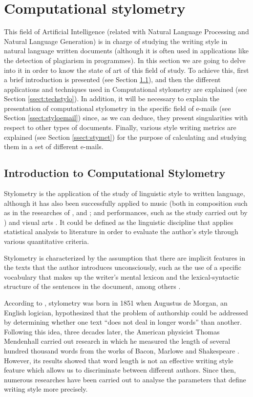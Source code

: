 \section{Computational stylometry}\label{sect:compstyl}
This field of Artificial Intelligence (related with Natural Language Processing and Natural Language Generation) is in charge of studying the writing style in natural language written documents (although it is often used in applications like the detection of plagiarism in programmes). In this section we are going to delve into it in order to know the state of art of this field of study. To achieve this, first a brief introduction is presented (see Section \ref{ssect:introstylo}), and then the different applications and techniques used in Computational stylometry are explained (see Section \ref{ssect:techstylo}). In addition, it will be necessary to explain the presentation of computational stylometry in the specific field of e-mails (see Section \ref{ssect:styloemail}) since, as we can deduce, they present singularities with respect to other types of documents. Finally, various style writing metrics are explained (see Section \ref{ssect:stymet}) for the purpose of calculating and studying them in a set of different e-mails.

\subsection{Introduction to Computational Stylometry}\label{ssect:introstylo}
Stylometry \citep{hughes2012quantitative} is the application of the study of linguistic style to written language, although it has also been successfully applied to music (both in composition such as in the researches of \cite{manaris2005zipf}, \cite{casey2008analysis} and \cite{huron1991ramp}; and performances, such as the study carried out by \cite{sapp2008hybrid}) and visual arts \citep{taylor1999fractal, hughes2010quantification}. It could be defined as the linguistic discipline that applies statistical analysis to literature in order to evaluate the author's style through various quantitative criteria.

Stylometry is characterized by the assumption that there are implicit features in the texts that the author introduces unconsciously, such as the use of a specific vocabulary that makes up the writer's mental lexicon and the lexical-syntactic structure of the sentences in the document, among others \citep{burrows1992computers}.

According to \cite{stylohist}, stylometry was born in 1851 when Augustus de Morgan, an English logician, hypothesized that the problem of authorship could be addressed by determining whether one text ``does not deal in longer words'' \citep{morganletters} than another. Following this idea, three decades later, the American physicist Thomas Mendenhall carried out research in which he measured the length of several hundred thousand words from the works of Bacon, Marlowe and Shakespeare \citep{mendenhall1887}. However, its results showed that word length is not an effective writing style feature which allows us to discriminate between different authors. Since then, numerous researches have been carried out to analyse the parameters that define writing style more precisely.

